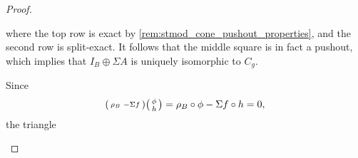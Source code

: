 \begin{proof}
\begin{enumerate}[label={(\bfseries TR\arabic*)}]
{\begin{center}
            \end{center}
            where the top row is exact by \autoref{rem:stmod_cone_pushout_properties}, and the second row is split-exact. It follows that the middle square is in fact a pushout, which implies that \( I_B \oplus \Sigma A  \) is uniquely isomorphic to \( C_g \).
            
            Since
            \[
                \begin{psmallmatrix}
                    \rho_B & -\Sigma f
                \end{psmallmatrix}
                \begin{psmallmatrix}
                    \phi \\
                    h
                \end{psmallmatrix}
                =
                \rho_B \circ \phi - \Sigma f \circ h = 0,
            \]
            the triangle
            \begin{center}
\end{center}}
\end{enumerate}
\end{proof}
